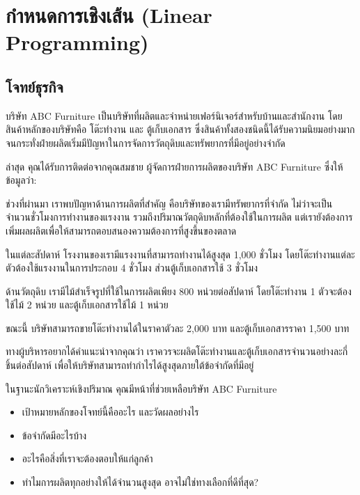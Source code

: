 \chapter{กำหนดการเชิงเส้น (Linear Programming)}\label{chapter:linprog}

\section*{โจทย์ธุรกิจ}
บริษัท ABC Furniture เป็นบริษัทที่ผลิตและจำหน่ายเฟอร์นิเจอร์สำหรับบ้านและสำนักงาน โดยสินค้าหลักของบริษัทคือ โต๊ะทำงาน และ ตู้เก็บเอกสาร ซึ่งสินค้าทั้งสองชนิดนี้ได้รับความนิยมอย่างมาก จนกระทั่งฝ่ายผลิตเริ่มมีปัญหาในการจัดการวัตถุดิบและทรัพยากรที่มีอยู่อย่างจำกัด

ล่าสุด คุณได้รับการติดต่อจากคุณสมชาย ผู้จัดการฝ่ายการผลิตของบริษัท ABC Furniture ซึ่งให้ข้อมูลว่า:
\begin{tcolorbox}[colback=white!100!white, colframe=black!80!white,
  title=ข้อความ,
  fonttitle=\bfseries,
  sharp corners=southwest,
  boxrule=0.8pt,
  left=1mm, right=1mm, top=1mm, bottom=1mm,
]
ช่วงที่ผ่านมา เราพบปัญหาด้านการผลิตที่สำคัญ คือบริษัทของเรามีทรัพยากรที่จำกัด ไม่ว่าจะเป็นจำนวนชั่วโมงการทำงานของแรงงาน รวมถึงปริมาณวัตถุดิบหลักที่ต้องใช้ในการผลิต แต่เรายังต้องการเพิ่มผลผลิตเพื่อให้สามารถตอบสนองความต้องการที่สูงขึ้นของตลาด

ในแต่ละสัปดาห์ โรงงานของเรามีแรงงานที่สามารถทำงานได้สูงสุด 1,000 ชั่วโมง โดยโต๊ะทำงานแต่ละตัวต้องใช้แรงงานในการประกอบ 4 ชั่วโมง ส่วนตู้เก็บเอกสารใช้ 3 ชั่วโมง

ด้านวัตถุดิบ เรามีไม้สำเร็จรูปที่ใช้ในการผลิตเพียง 800 หน่วยต่อสัปดาห์ โดยโต๊ะทำงาน 1 ตัวจะต้องใช้ไม้ 2 หน่วย และตู้เก็บเอกสารใช้ไม้ 1 หน่วย

ขณะนี้ บริษัทสามารถขายโต๊ะทำงานได้ในราคาตัวละ 2,000 บาท และตู้เก็บเอกสารราคา 1,500 บาท

ทางผู้บริหารอยากได้คำแนะนำจากคุณว่า เราควรจะผลิตโต๊ะทำงานและตู้เก็บเอกสารจำนวนอย่างละกี่ชิ้นต่อสัปดาห์ เพื่อให้บริษัทสามารถทำกำไรได้สูงสุดภายใต้ข้อจำกัดที่มีอยู่
\end{tcolorbox}

ในฐานะนักวิเคราะห์เชิงปริมาณ คุณมีหน้าที่ช่วยเหลือบริษัท ABC Furniture
\begin{itemize}
    \item เป้าหมายหลักของโจทย์นี้คืออะไร และวัดผลอย่างไร
    \item ข้อจำกัดมีอะไรบ้าง
    \item อะไรคือสิ่งที่เราจะต้องตอบให้แก่ลูกค้า
    \item ทำไมการผลิตทุกอย่างให้ได้จำนวนสูงสุด อาจไม่ใช่ทางเลือกที่ดีที่สุด?
\end{itemize}

